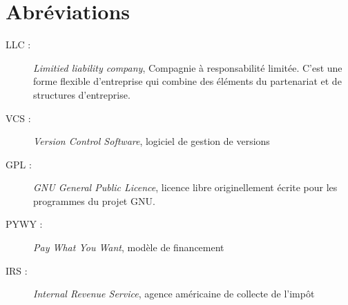 \chapter*{Abréviations}

\begin{description}
    \item[LLC : ] \emph{Limitied liability company}, Compagnie à
        responsabilité limitée. C'est une forme flexible d'entreprise qui
        combine des éléments du partenariat et de structures d'entreprise.
    \item[VCS : ] \emph{Version Control Software}, logiciel de gestion de versions
    \item[GPL : ] \emph{GNU General Public Licence}, licence libre originellement
        écrite pour les programmes du projet GNU.
    \item[PYWY :] \emph{Pay What You Want}, modèle de financement
    \item[IRS :] \emph{Internal Revenue Service}, agence américaine de collecte de l'impôt
\end{description}
